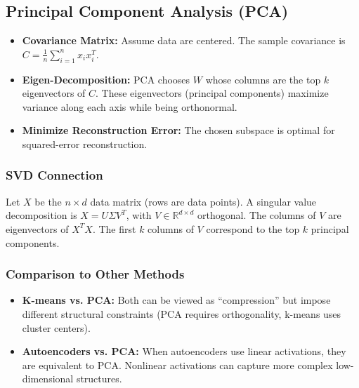 \documentclass[twocolumn]{article}
\begin{document}
\begin{spacing}{1}
\subsection{Principal Component Analysis (PCA)}
\begin{itemize}
    \item \textbf{Covariance Matrix:} Assume data are centered. The sample covariance is $C = \frac{1}{n}\sum_{i=1}^n x_i x_i^T$.
    \item \textbf{Eigen-Decomposition:} PCA chooses $W$ whose columns are the top $k$ eigenvectors of $C$. These eigenvectors (principal components) maximize variance along each axis while being orthonormal.
    \item \textbf{Minimize Reconstruction Error:} The chosen subspace is optimal for squared-error reconstruction.
\end{itemize}

\subsubsection{SVD Connection}
Let $X$ be the $n \times d$ data matrix (rows are data points). A singular value decomposition is $X = U \Sigma V^T$, with $V \in \mathbb{R}^{d \times d}$ orthogonal. The columns of $V$ are eigenvectors of $X^T X$. The first $k$ columns of $V$ correspond to the top $k$ principal components.

\subsubsection{Comparison to Other Methods}
\begin{itemize}
    \item \textbf{K-means vs. PCA:} Both can be viewed as “compression” but impose different structural constraints (PCA requires orthogonality, k-means uses cluster centers).
    \item \textbf{Autoencoders vs. PCA:} When autoencoders use linear activations, they are equivalent to PCA. Nonlinear activations can capture more complex low-dimensional structures.
\end{itemize}


\end{spacing}
\end{document}
